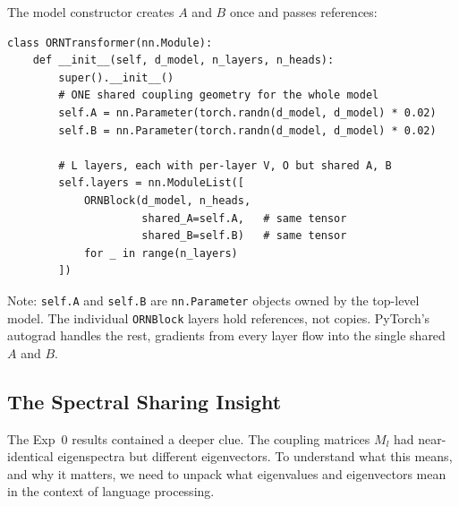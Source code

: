 \documentclass[11pt, a4paper]{article}
\theoremstyle{remark}
\begin{document}
The model constructor creates $A$ and $B$ once and passes references:

\begin{lstlisting}[caption={Model constructor: creating shared coupling once}]
class ORNTransformer(nn.Module):
    def __init__(self, d_model, n_layers, n_heads):
        super().__init__()
        # ONE shared coupling geometry for the whole model
        self.A = nn.Parameter(torch.randn(d_model, d_model) * 0.02)
        self.B = nn.Parameter(torch.randn(d_model, d_model) * 0.02)

        # L layers, each with per-layer V, O but shared A, B
        self.layers = nn.ModuleList([
            ORNBlock(d_model, n_heads,
                     shared_A=self.A,   # same tensor
                     shared_B=self.B)   # same tensor
            for _ in range(n_layers)
        ])
\end{lstlisting}

\noindent
Note: \texttt{self.A} and \texttt{self.B} are \texttt{nn.Parameter} objects owned by the top-level model.
The individual \texttt{ORNBlock} layers hold references, not copies.
PyTorch's autograd handles the rest, gradients from every layer flow into the single shared $A$ and $B$.

\subsection{The Spectral Sharing Insight}
\label{sec:grn:spectral}
\label{sec:spectral-sharing}

The Exp~0 results contained a deeper clue.
The coupling matrices $M_l$ had near-identical eigenspectra but different eigenvectors.
To understand what this means, and why it matters, we need to unpack what eigenvalues and eigenvectors mean in the context of language processing.
\end{document}
